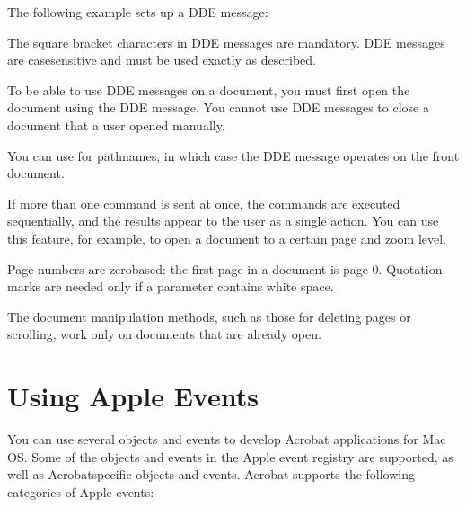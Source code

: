 \documentclass[letterpaper,12pt,english,openany,oneside]{sphinxmanual}
\begin{document}
The following example sets up a DDE message:

\begin{sphinxVerbatim}[commandchars=\\\{\}]
  
  
  
\end{sphinxVerbatim}

The square bracket characters in DDE messages are mandatory. DDE messages are case\sphinxhyphen{}sensitive and must be used exactly as described.

To be able to use DDE messages on a document, you must first open the document using the  DDE message. You cannot use DDE messages to close a document that a user opened manually.

You can use  for pathnames, in which case the DDE message operates on the front document.

If more than one command is sent at once, the commands are executed sequentially, and the results appear to the user as a single action. You can use this feature, for example, to open a document to a certain page and zoom level.

Page numbers are zero\sphinxhyphen{}based: the first page in a document is page 0. Quotation marks are needed only if a parameter contains white space.

The document manipulation methods, such as those for deleting pages or scrolling, work only on documents that are already open.


\chapter{Using Apple Events}
\label{\detokenize{IAC_DevApp_AppleEvents:using-apple-events}}\label{\detokenize{IAC_DevApp_AppleEvents::doc}}
You can use several objects and events to develop Acrobat applications for Mac OS. Some of the objects and events in the Apple event registry are supported, as well as Acrobat\sphinxhyphen{}specific objects and events. Acrobat supports the following categories of Apple events:
\end{document}
